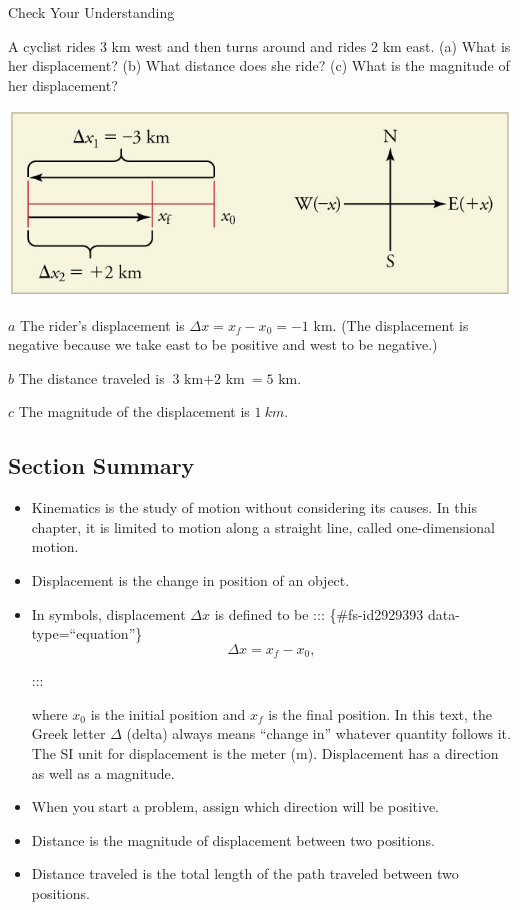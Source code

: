 \documentclass[
]{book}
\begin{document}
\hypertarget{fs-id3589986}{}
Check Your Understanding

\leavevmode\hypertarget{fs-id2996632}{}%
A cyclist rides 3 km west and then turns around and rides 2 km east. (a)
What is her displacement? (b) What distance does she ride? (c) What is
the magnitude of her displacement?

\leavevmode\hypertarget{fs-id1711333}{}%
\includegraphics{images/Figure_02_01_03.jpg}

\(a\) The rider's displacement is
\({{\Delta x = {x_{f} - x_{0}}} = \text{−1\ km}}{}\). (The displacement is
negative because we take east to be positive and west to be negative.)

\(b\) The distance traveled is
\({{\text{3\ km} + \text{2\ km}} = \text{5\ km}}{}\).

\(c\) The magnitude of the displacement is \(1\ km{}\).

\hypertarget{fs-id2758854-summary}{}
\hypertarget{section-summary}{%
\subsection{Section Summary}\label{section-summary}}

\begin{itemize}
\item
  Kinematics is the study of motion without considering its causes. In
  this chapter, it is limited to motion along a straight line, called
  one-dimensional motion.
\item
  Displacement is the change in position of an object.
\item
  In symbols, displacement \({\Delta x}{}\) is defined to be
  ::: \{\#fs-id2929393 data-type=``equation''\}
  \[{\Delta x = {x_{f} - x_{0}},}{}\]

  :::

  where \(x_{0}\) is the initial position and \(x_{f}{}\) is the final
  position. In this text, the Greek letter \(\Delta{}\) (delta) always
  means ``change in'' whatever quantity follows it. The SI unit for
  displacement is the meter (m). Displacement has a direction as well
  as a magnitude.
\item
  When you start a problem, assign which direction will be positive.
\item
  Distance is the magnitude of displacement between two positions.
\item
  Distance traveled is the total length of the path traveled between
  two positions.
\end{itemize}
\end{document}
